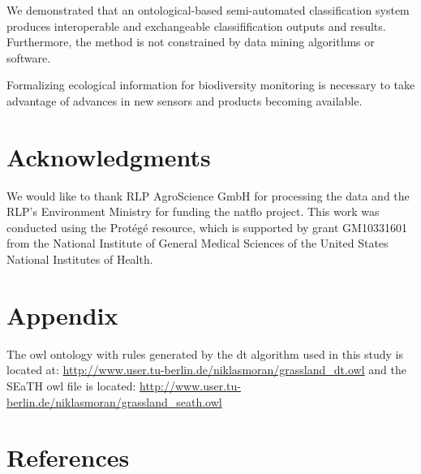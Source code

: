 \documentclass[authoryear,preprint,12pt,number]{elsarticle}
\begin{document}
We demonstrated that an ontological-based semi-automated classification system
produces interoperable and exchangeable classifification outputs
and results. Furthermore, the method is not constrained by data mining
algorithms or software.  

Formalizing ecological information for biodiversity monitoring is
necessary to take advantage of advances in new sensors and products becoming
available. 
\section{Acknowledgments}
We would like to thank RLP AgroScience GmbH for processing the data and the 
RLP's Environment Ministry for funding the \gls{natflo} project. This work was 
conducted using the Prot\'eg\'e resource, which is supported by grant 
GM10331601 from the National Institute of General Medical Sciences of the 
United States National Institutes of Health.
\section{Appendix}
The \gls{owl} ontology with rules generated by the \gls{dt} algorithm used in 
this study is
located at: \url{http://www.user.tu-berlin.de/niklasmoran/grassland_dt.owl} and
the SEaTH \gls{owl} file is located:
\url{http://www.user.tu-berlin.de/niklasmoran/grassland_seath.owl}

\section{References}

\end{document}
